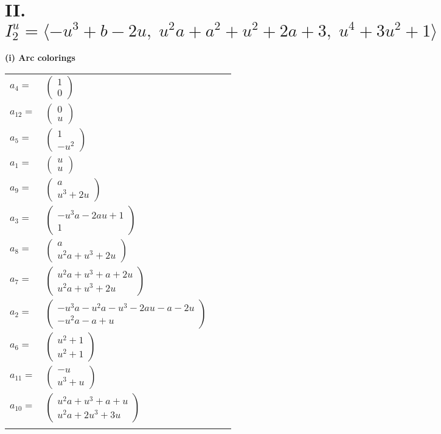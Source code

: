 \documentclass[1p]{elsarticle_modified}
\theoremstyle{definition}
\begin{document}
\centering \section*{II. $I^u_{2}= \langle - u^3+b-2 u,\;u^2 a+a^2+u^2+2 a+3,\;u^4+3 u^2+1 \rangle$}
\flushleft \textbf{(i) Arc colorings}\\
\begin{tabular}{m{7pt} m{180pt} m{7pt} m{180pt} }
\flushright $a_{4}=$&$\begin{pmatrix}1\\0\end{pmatrix}$ \\
\flushright $a_{12}=$&$\begin{pmatrix}0\\u\end{pmatrix}$ \\
\flushright $a_{5}=$&$\begin{pmatrix}1\\- u^2\end{pmatrix}$ \\
\flushright $a_{1}=$&$\begin{pmatrix}u\\u\end{pmatrix}$ \\
\flushright $a_{9}=$&$\begin{pmatrix}a\\u^3+2 u\end{pmatrix}$ \\
\flushright $a_{3}=$&$\begin{pmatrix}- u^3 a-2 a u+1\\1\end{pmatrix}$ \\
\flushright $a_{8}=$&$\begin{pmatrix}a\\u^2 a+u^3+2 u\end{pmatrix}$ \\
\flushright $a_{7}=$&$\begin{pmatrix}u^2 a+u^3+a+2 u\\u^2 a+u^3+2 u\end{pmatrix}$ \\
\flushright $a_{2}=$&$\begin{pmatrix}- u^3 a- u^2 a- u^3-2 a u- a-2 u\\- u^2 a- a+u\end{pmatrix}$ \\
\flushright $a_{6}=$&$\begin{pmatrix}u^2+1\\u^2+1\end{pmatrix}$ \\
\flushright $a_{11}=$&$\begin{pmatrix}- u\\u^3+u\end{pmatrix}$ \\
\flushright $a_{10}=$&$\begin{pmatrix}u^2 a+u^3+a+u\\u^2 a+2 u^3+3 u\end{pmatrix}$\\&\end{tabular}
\end{document}

